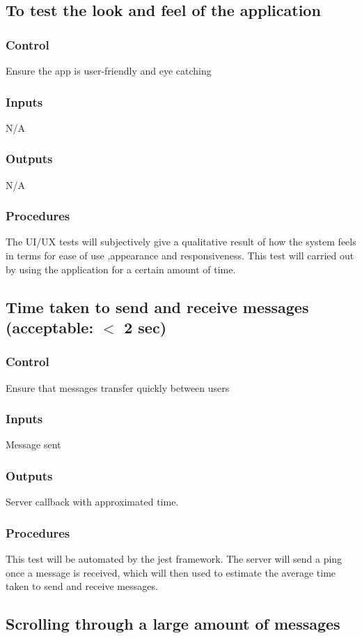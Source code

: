 \documentclass[12pt, titlepage]{article}
\begin{document}
\subsection{To test the look and feel of the application}
\subsubsection{Control}
Ensure the app is user-friendly and eye catching
\subsubsection{Inputs}
N/A
\subsubsection{Outputs}
N/A
\subsubsection{Procedures}
The UI/UX tests will subjectively give a qualitative result of how the system feels in terms for ease of use ,appearance and responsiveness. This test will carried out by using the application for a certain amount of time.
\subsection{Time taken to send and receive messages (acceptable: $<$ 2 sec)}
\subsubsection{Control}
Ensure that messages transfer quickly between users
\subsubsection{Inputs}
Message sent
\subsubsection{Outputs}
Server callback with approximated time.
\subsubsection{Procedures}
This test will be automated by the jest framework. The server will send a ping once a message is received, which will then used to estimate the average time taken to send and receive messages.
\subsection{Scrolling through a large amount of messages}
\end{document}
